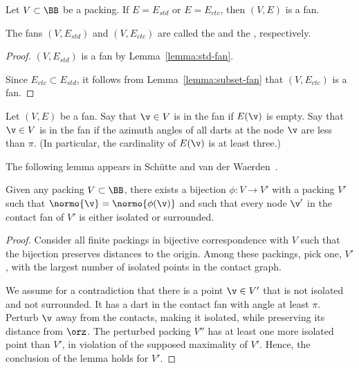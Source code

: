 \begin{lemma}[]
Let $V\subset \BB$ be a packing.  If $E=E_{std}$ or $E=E_{ctc}$, then
$(V,E)$ is a fan.
\end{lemma}

\begin{definition}
The fans $(V,E_{std})$ and $(V,E_{ctc})$ are called the  and
the , respectively.  
\end{definition}
%
%
%
%
%
%
%

\begin{proof} 
$(V,E_{std})$ is a fan by Lemma~\ref{lemma:std-fan}.

Since $E_{ctc}\subset E_{std}$, it follows from
Lemma~\ref{lemma:subset-fan} that $(V,E_{ctc})$ is a fan.
\end{proof}

\begin{definition}
  Let $(V,E)$ be a fan.  Say that $\v\in V$ is  in
  the fan if $E(\v)$ is empty.  Say that $\v\in V$ is
   in the fan if the azimuth angles of all darts
  at the node $\v$ are less than $\pi$.  (In particular, the
  cardinality of $E(\v)$ is at least three.)
\end{definition}
%
%
%
%
%
%

The following lemma appears in Sch\"utte and van der
Waerden~\cite{vanderWaerden:1951}.

\begin{lemma}[]
\label{lemma:iso-surround}
Given any packing $V\subset \BB$,
there exists a bijection $\phi:V\to V'$ with a  packing $V'$ 
such that $\normo{\v} = \normo{\phi(\v)}$ and
such that every node $\v'$ in the contact fan of $V'$
is either isolated or surrounded.
\end{lemma}
%
%
%

\begin{proof} Consider all finite packings in bijective correspondence
  with $V$ such that the bijection preserves distances to
  the origin.  Among these packings, pick one, $V'$, with the largest
  number of isolated points in the contact graph.  

We assume for a contradiction that  there is a point
  $\v\in V'$ that is not isolated and not surrounded.  It  has a
  dart in the contact fan with angle at least $\pi$.  Perturb $\v$ away from the
  contacts, making it isolated, while preserving its distance from
  $\orz$.  The perturbed packing $V''$ has at least one more isolated point
  than $V'$, in violation of the supposed maximality of $V'$.
  Hence, the conclusion of the lemma holds for $V'$.
\end{proof}

